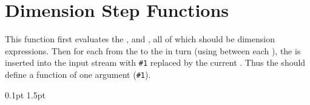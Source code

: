 \documentclass[oneside]{book}
\begin{document}
\section{Dimension Step Functions}


\begin{function}{\dimStepInline}
\begin{syntax}
    
\end{syntax}
This function first evaluates the , 
and , all of which should be dimension expressions.
Then for each  from the  to the
 in turn (using  between each
), the  is inserted into the input stream
with \verb|#1| replaced by the current .  Thus the
 should define a function of one argument (\verb|#1|).
\begin{demohigh}
\IgnoreSpacesOn
\tlClear \lTmpaTl
\dimStepInline {1pt} {0.1pt} {1.5pt} {
  \tlPutRight \lTmpaTl {[#1]}
}
\tlUse \lTmpaTl
\IgnoreSpacesOff
\end{demohigh}
\end{function}
\end{document}
